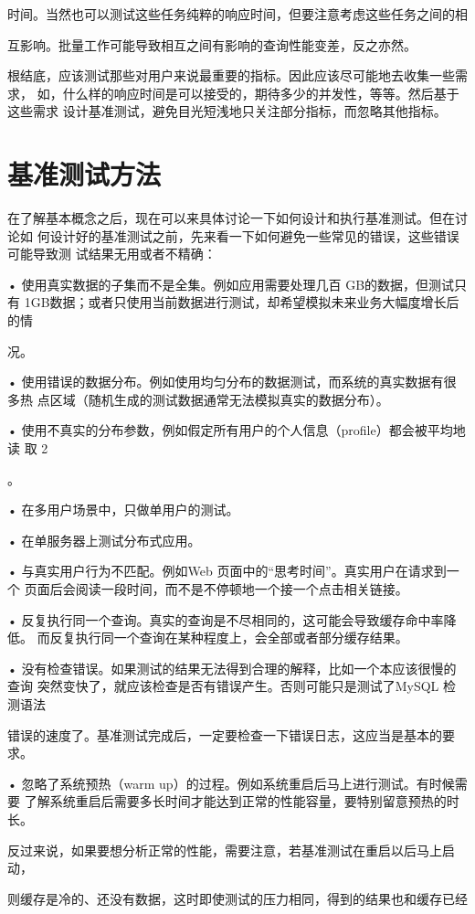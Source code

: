 时间。当然也可以测试这些任务纯粹的响应时间，但要注意考虑这些任务之间的相

互影响。批量工作可能导致相互之间有影响的查询性能变差，反之亦然。

根结底，应该测试那些对用户来说最重要的指标。因此应该尽可能地去收集一些需求，
如，什么样的响应时间是可以接受的，期待多少的并发性，等等。然后基于这些需求
设计基准测试，避免目光短浅地只关注部分指标，而忽略其他指标。

\section{基准测试方法}
在了解基本概念之后，现在可以来具体讨论一下如何设计和执行基准测试。但在讨论如
何设计好的基准测试之前，先来看一下如何避免一些常见的错误，这些错误可能导致测
试结果无用或者不精确：

• 使用真实数据的子集而不是全集。例如应用需要处理几百 GB的数据，但测试只有
1GB数据；或者只使用当前数据进行测试，却希望模拟未来业务大幅度增长后的情

况。

• 使用错误的数据分布。例如使用均匀分布的数据测试，而系统的真实数据有很多热
点区域（随机生成的测试数据通常无法模拟真实的数据分布）。

• 使用不真实的分布参数，例如假定所有用户的个人信息（profile）都会被平均地读
取 2

。

• 在多用户场景中，只做单用户的测试。

• 在单服务器上测试分布式应用。

• 与真实用户行为不匹配。例如Web 页面中的“思考时间”。真实用户在请求到一个
页面后会阅读一段时间，而不是不停顿地一个接一个点击相关链接。

• 反复执行同一个查询。真实的查询是不尽相同的，这可能会导致缓存命中率降低。
而反复执行同一个查询在某种程度上，会全部或者部分缓存结果。

• 没有检查错误。如果测试的结果无法得到合理的解释，比如一个本应该很慢的查询
突然变快了，就应该检查是否有错误产生。否则可能只是测试了MySQL 检测语法

错误的速度了。基准测试完成后，一定要检查一下错误日志，这应当是基本的要求。

• 忽略了系统预热（warm up）的过程。例如系统重启后马上进行测试。有时候需要
了解系统重启后需要多长时间才能达到正常的性能容量，要特别留意预热的时长。

反过来说，如果要想分析正常的性能，需要注意，若基准测试在重启以后马上启动，

则缓存是冷的、还没有数据，这时即使测试的压力相同，得到的结果也和缓存已经

